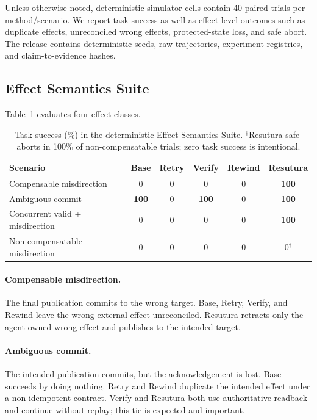 \documentclass{article}
\begin{document}
Unless otherwise noted, deterministic simulator cells contain 40 paired trials per method/scenario. We report task success as well as effect-level outcomes such as duplicate effects, unreconciled wrong effects, protected-state loss, and safe abort. The release contains deterministic seeds, raw trajectories, experiment registries, and claim-to-evidence hashes.

\subsection{Effect Semantics Suite}
Table~\ref{tab:effects} evaluates four effect classes.

\begin{table}[t]
\centering
\small
\begin{tabular}{lccccc}
\toprule
Scenario & Base & Retry & Verify & Rewind & Resutura \\
\midrule
Compensable misdirection & 0 & 0 & 0 & 0 & \textbf{100} \\
Ambiguous commit & \textbf{100} & 0 & \textbf{100} & 0 & \textbf{100} \\
Concurrent valid + misdirection & 0 & 0 & 0 & 0 & \textbf{100} \\
Non-compensatable misdirection & 0 & 0 & 0 & 0 & 0$^{\dagger}$ \\
\bottomrule
\end{tabular}
\caption{Task success (\%) in the deterministic Effect Semantics Suite. $^{\dagger}$Resutura safe-aborts in 100\% of non-compensatable trials; zero task success is intentional.}
\label{tab:effects}
\end{table}

\paragraph{Compensable misdirection.} The final publication commits to the wrong target. Base, Retry, Verify, and Rewind leave the wrong external effect unreconciled. Resutura retracts only the agent-owned wrong effect and publishes to the intended target.

\paragraph{Ambiguous commit.} The intended publication commits, but the acknowledgement is lost. Base succeeds by doing nothing. Retry and Rewind duplicate the intended effect under a non-idempotent contract. Verify and Resutura both use authoritative readback and continue without replay; this tie is expected and important.
\end{document}
